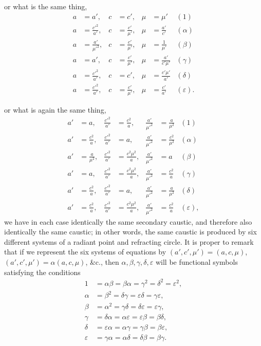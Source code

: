 \documentclass[11pt]{article}
\begin{document}
\newpage

\noindent or what is the same thing,
\begin{align*}
a &= a', & c &= c', & \mu &= \mu' & (1) \\
a &= \tfrac{c'^2}{a'}, & c &= \tfrac{c'}{\mu'}, & \mu &= \tfrac{a'}{c'} & (\alpha) \\
a &= \tfrac{a'}{\mu'^2}, & c &= \tfrac{c'}{\mu'}, & \mu &= \tfrac{1}{\mu'} & (\beta) \\
a &= a', & c &= \tfrac{c'}{\mu'}, & \mu &= \tfrac{a'}{c'\mu'} & (\gamma) \\
a &= \tfrac{c'^2}{a'}, & c &= c', & \mu &= \tfrac{c'\mu'}{a'} & (\delta) \\
a &= \tfrac{c'^2}{a'}, & c &= \tfrac{c'}{\mu'}, & \mu &= \tfrac{c'}{a'} & (\varepsilon).
\end{align*}

\noindent or what is again the same thing,
\begin{align*}
a' &= a, & \tfrac{c'^2}{a'} &= \tfrac{c^2}{a}, & \tfrac{a'}{\mu'^2} &= \tfrac{a}{\mu^2} & (1) \\
a' &= \tfrac{c^2}{a}, & \tfrac{c'^2}{a'} &= a, & \tfrac{a'}{\mu'^2} &= \tfrac{c^2}{\mu^2} & (\alpha) \\
a' &= \tfrac{a}{\mu^2}, & \tfrac{c'^2}{a'} &= \tfrac{c^2 \mu^2}{a}, & \tfrac{a'}{\mu'^2} &= a & (\beta) \\
a' &= a, & \tfrac{c'^2}{a'} &= \tfrac{c^2 \mu^2}{a}, & \tfrac{a'}{\mu'^2} &= \tfrac{c^2}{a} & (\gamma) \\
a' &= \tfrac{c^2}{a}, & \tfrac{c'^2}{a'} &= a, & \tfrac{a'}{\mu'^2} &= \tfrac{a}{\mu^2} & (\delta) \\
a' &= \tfrac{c^2}{a}, & \tfrac{c'^2}{a'} &= \tfrac{c^2 \mu^2}{a}, & \tfrac{a'}{\mu'^2} &= \tfrac{c^2}{a} & (\varepsilon),
\end{align*}
we have in each case identically the same secondary caustic, and therefore also identically the same caustic; in other words, the same caustic is produced by six different systems of a radiant point and refracting circle. It is proper to remark that if we represent the six systems of equations by $(a',c',\mu') = (a,c,\mu)$, $(a',c',\mu') = \alpha(a,c,\mu)$, \&c., then $\alpha,\beta,\gamma,\delta,\varepsilon$ will be functional symbols satisfying the conditions
\begin{align*}
1 &= \alpha\beta = \beta\alpha = \gamma^2 = \delta^2 = \varepsilon^2, \\
\alpha &= \beta^2 = \delta\gamma = \varepsilon\delta = \gamma\varepsilon, \\
\beta &= \alpha^2 = \gamma\delta = \delta\varepsilon = \varepsilon\gamma, \\
\gamma &= \delta\alpha = \alpha\varepsilon = \varepsilon\beta = \beta\delta, \\
\delta &= \varepsilon\alpha = \alpha\gamma = \gamma\beta = \beta\varepsilon, \\
\varepsilon &= \gamma\alpha = \alpha\delta = \delta\beta = \beta\gamma.
\end{align*}
\end{document}
